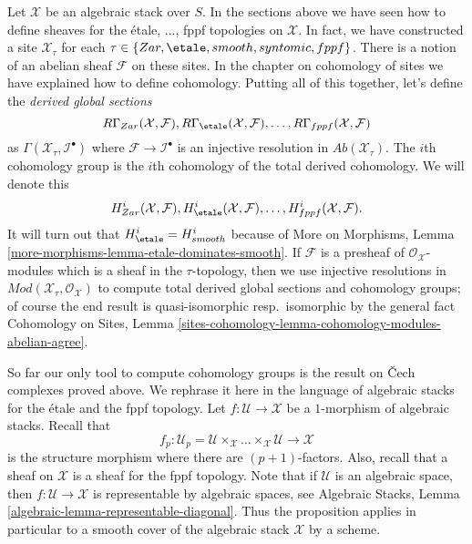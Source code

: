 \noindent
Let $\mathcal{X}$ be an algebraic stack over $S$. In the sections above
we have seen how to define sheaves for the \'etale, ..., fppf
topologies on $\mathcal{X}$. In fact, we have constructed a site
$\mathcal{X}_\tau$ for each $\tau \in \{Zar, \etale, smooth, syntomic,
fppf\}$. There is a notion of an abelian sheaf $\mathcal{F}$ on these sites.
In the chapter on cohomology of sites we have explained how to define
cohomology. Putting all of this together, let's define the
{\it derived global sections}
$$
R\Gamma_{Zar}(\mathcal{X}, \mathcal{F}),
R\Gamma_\etale(\mathcal{X}, \mathcal{F}), \ldots,
R\Gamma_{fppf}(\mathcal{X}, \mathcal{F})
$$
as $\Gamma(\mathcal{X}_\tau, \mathcal{I}^\bullet)$ where
$\mathcal{F} \to \mathcal{I}^\bullet$ is an injective resolution
in $\textit{Ab}(\mathcal{X}_\tau)$. The $i$th cohomology group is the
$i$th cohomology of the total derived cohomology. We will denote
this
$$
H^i_{Zar}(\mathcal{X}, \mathcal{F}),
H^i_\etale(\mathcal{X}, \mathcal{F}), \ldots,
H^i_{fppf}(\mathcal{X}, \mathcal{F}).
$$
It will turn out that $H^i_\etale = H^i_{smooth}$
because of
More on Morphisms, Lemma \ref{more-morphisms-lemma-etale-dominates-smooth}.
If $\mathcal{F}$ is a presheaf of $\mathcal{O}_\mathcal{X}$-modules
which is a sheaf in the $\tau$-topology, then we use injective
resolutions in $\textit{Mod}(\mathcal{X}_\tau, \mathcal{O}_\mathcal{X})$
to compute total derived global sections and cohomology groups; of course
the end result is quasi-isomorphic resp.\ isomorphic by the general fact
Cohomology on Sites, Lemma
\ref{sites-cohomology-lemma-cohomology-modules-abelian-agree}.

\medskip\noindent
So far our only tool to compute cohomology groups is the result on
{\v C}ech complexes proved above. We rephrase it here in the language
of algebraic stacks for the \'etale and the fppf topology. Let
$f : \mathcal{U} \to \mathcal{X}$ be a $1$-morphism of algebraic stacks.
Recall that
$$
f_p : \mathcal{U}_p =
\mathcal{U} \times_\mathcal{X} \ldots \times_\mathcal{X} \mathcal{U}
\longrightarrow
\mathcal{X}
$$
is the structure morphism where there are $(p + 1)$-factors. Also, recall
that a sheaf on $\mathcal{X}$ is a sheaf for the fppf topology. Note
that if $\mathcal{U}$ is an algebraic space, then
$f : \mathcal{U} \to \mathcal{X}$ is representable by algebraic spaces,
see
Algebraic Stacks, Lemma \ref{algebraic-lemma-representable-diagonal}.
Thus the proposition applies in particular to a smooth cover of the
algebraic stack $\mathcal{X}$ by a scheme.

